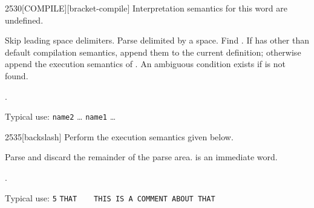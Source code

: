\begin{worddef}{2530}{[COMPILE]}[bracket-compile]
\interpret
	Interpretation semantics for this word are undefined.

\compile

	Skip leading space delimiters. Parse  delimited by
	a space. Find . If  has other than default
	compilation semantics, append them to the current definition;
	otherwise append the execution semantics of . An
	ambiguous condition exists if  is not found.

\see {}.

	\begin{defer}
	\rationale %
		Typical use:
			\word{:} \texttt{name2} {\ldots}
				\word{[COMPILE]} \texttt{name1}
			{\ldots} \word{;} ~ 
	\end{defer}
\end{worddef}


\begin{worddef}[bs]{2535}{\bs}[backslash]
\compile
	Perform the execution semantics given below.

\execute
	\stack{"ccc<eol>"}{}

	Parse and discard the remainder of the parse area.
	 is an immediate word.

\see {}.

	\begin{defer}
	\rationale %
		Typical use:
			\texttt{5}  \texttt{THAT}
			~  ~ \texttt{THIS IS A COMMENT ABOUT THAT}
	\end{defer}
\end{worddef}
